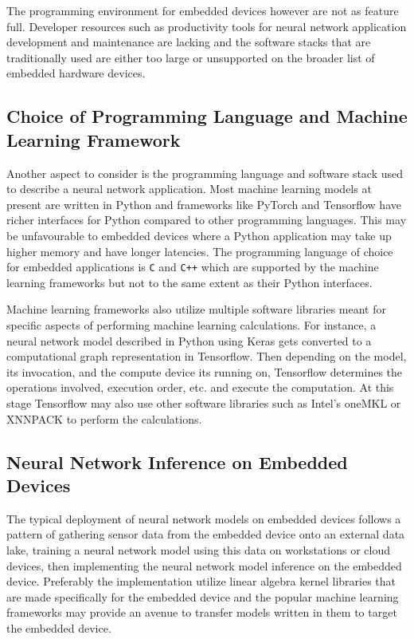 The programming environment for embedded devices however are not as feature full. Developer resources such as productivity tools for neural network application development and maintenance are lacking and the software stacks that are traditionally used are either too large or unsupported on the broader list of embedded hardware devices.

\subsection{Choice of Programming Language and Machine Learning Framework}

Another aspect to consider is the programming language and software stack used to describe a neural network application. Most machine learning models at present are written in Python and frameworks like PyTorch and Tensorflow have richer interfaces for Python compared to other programming languages. This may be unfavourable to embedded devices where a Python application may take up higher memory and have longer latencies. The programming language of choice for embedded applications is \texttt{C} and \texttt{C++} which are supported by the machine learning frameworks but not to the same extent as their Python interfaces.

Machine learning frameworks also utilize multiple software libraries meant for specific aspects of performing machine learning calculations. For instance, a neural network model described in Python using Keras gets converted to a computational graph representation in Tensorflow. Then depending on the model, its invocation, and the compute device its running on, Tensorflow determines the operations involved, execution order, etc. and execute the computation. At this stage Tensorflow may also use other software libraries such as Intel's oneMKL \cite{oneMKL} or XNNPACK \cite{XNNPACK} to perform the calculations.

\subsection{Neural Network Inference on Embedded Devices}

The typical deployment of neural network models on embedded devices follows a pattern of gathering sensor data from the embedded device onto an external data lake, training a neural network model using this data on workstations or cloud devices, then implementing the neural network model inference on the embedded device. Preferably the implementation utilize linear algebra kernel libraries that are made specifically for the embedded device and the popular machine learning frameworks may provide an avenue to transfer models written in them to target the embedded device.


